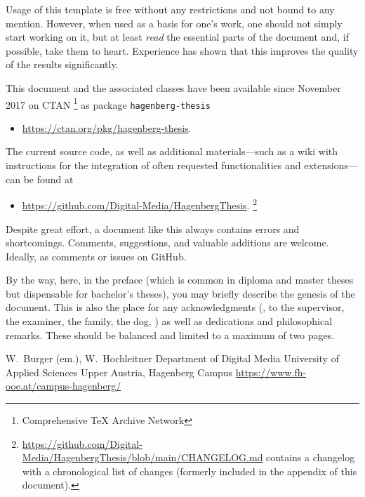 Usage of this template is free without any restrictions and not bound to any
mention. However, when used as a basis for one's work, one should not simply
start working on it, but at least \emph{read} the essential parts of the
document and, if possible, take them to heart. Experience has shown that this
improves the quality of the results significantly.

This document and the associated \latex classes have been available since
November 2017 on CTAN%
\footnote{Comprehensive TeX Archive Network} 
as package \texttt{hagenberg-thesis}
%
\begin{itemize}
	\item[]\url{https://ctan.org/pkg/hagenberg-thesis}.
\end{itemize}
%
The current source code, as well as additional materials---such as a wiki with
instructions for the integration of often requested functionalities and
extensions---can be found at
%
\begin{itemize}
	\item[]\url{https://github.com/Digital-Media/HagenbergThesis}.%
	\footnote{\url{https://github.com/Digital-Media/HagenbergThesis/blob/main/CHANGELOG.md}
	contains a change\-log with a chronological list of changes (formerly
	included in the appendix of this document).}
\end{itemize}

\noindent
Despite great effort, a document like this always contains errors and
shortcomings. Comments, suggestions, and valuable additions are welcome.
Ideally, as comments or issues on GitHub.

By the way, here, in the preface (which is common in diploma and master theses
but dispensable for bachelor's theses), you may briefly describe the genesis of
the document. This is also the place for any acknowledgments (\eg, to the
supervisor, the examiner, the family, the dog, \etc) as well as dedications and
philosophical remarks. These should be balanced and limited to a maximum of two
pages.

\vspace{6ex}
\noindent
W.\ Burger (em.), W.\ Hochleitner\newline
Department of Digital Media\newline
University of Applied Sciences Upper Austria, Hagenberg Campus \newline
\url{https://www.fh-ooe.at/campus-hagenberg/}

